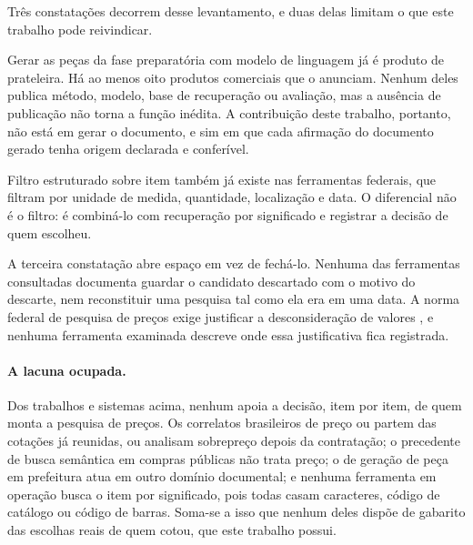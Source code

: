 Três constatações decorrem desse levantamento, e duas delas limitam o que este
trabalho pode reivindicar.

Gerar as peças da fase preparatória com modelo de linguagem já é produto de
prateleira. Há ao menos oito produtos comerciais que o anunciam. Nenhum deles
publica método, modelo, base de recuperação ou avaliação, mas a ausência de
publicação não torna a função inédita. A contribuição deste trabalho, portanto,
não está em gerar o documento, e sim em que cada afirmação do documento gerado
tenha origem declarada e conferível.

Filtro estruturado sobre item também já existe nas ferramentas federais, que
filtram por unidade de medida, quantidade, localização e data. O diferencial não
é o filtro: é combiná-lo com recuperação por significado e registrar a decisão de
quem escolheu.

A terceira constatação abre espaço em vez de fechá-lo. Nenhuma das ferramentas
consultadas documenta guardar o candidato descartado com o motivo do descarte,
nem reconstituir uma pesquisa tal como ela era em uma data. A norma federal de
pesquisa de preços exige justificar a desconsideração de valores
\cite{brasil2021in65}, e nenhuma ferramenta examinada descreve onde essa
justificativa fica registrada.

\paragraph{A lacuna ocupada.} Dos trabalhos e sistemas acima, nenhum apoia a
decisão, item por item, de quem monta a pesquisa de preços. Os correlatos
brasileiros de preço ou partem das cotações já reunidas, ou analisam sobrepreço
depois da contratação; o precedente de busca semântica em compras públicas não
trata preço; o de geração de peça em prefeitura atua em outro domínio
documental; e nenhuma ferramenta em operação busca o item por significado, pois
todas casam caracteres, código de catálogo ou código de barras. Soma-se a isso
que nenhum deles dispõe de gabarito das escolhas reais de quem cotou, que este
trabalho possui.

